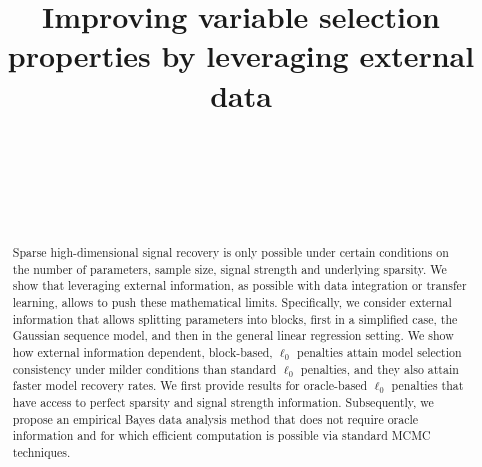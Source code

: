 \documentclass[bj,authoryear]{imsart}
\theoremstyle{plain}
\begin{document}
\begin{frontmatter}
\title{Improving variable selection properties by leveraging external data}

\begin{aug}
\author[A]{~}
\author[A]{~}
\author[B]{~}
\address[A]{Department of Economics and Business, Universitat Pompeu Fabra }
\address[B]{Department of Statistical Sciences, University or Toronto
}
\end{aug}

\begin{abstract}
Sparse high-dimensional signal recovery is only possible under certain conditions on the number of parameters, sample size, signal strength and underlying sparsity. We show that leveraging external information, as possible with data integration or transfer learning, allows to push these mathematical limits. Specifically, we consider external information that allows splitting parameters into blocks, first in a simplified case, the Gaussian sequence model, and then in the general linear regression setting. We show how external information dependent, block-based, $\ell_0$ penalties attain model selection consistency under milder conditions than standard $\ell_0$ penalties, and they also attain faster model recovery rates. We first provide results for oracle-based $\ell_0$ penalties that have access to perfect sparsity and signal strength information. Subsequently, we propose an empirical Bayes data analysis method that does not require oracle information and for which efficient computation is possible via standard MCMC techniques.


\end{abstract}
\end{frontmatter}
\end{document}
